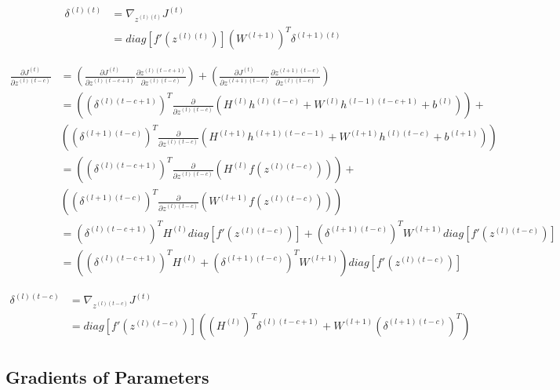 \documentclass{article}
\begin{document}
	\begin{equation}
	\begin{aligned}
		\delta^{(l)(t)} 
		&= \nabla_{z^{(l)(t)}} J^{(t)} \\
		&= diag[f'(z^{(l)(t)})] (W^{(l+1)})^T \delta^{(l+1)(t)}
	\end{aligned}
	\end{equation}
	
	\begin{equation}
	\begin{aligned}
		\frac{\partial J^{(t)}}{\partial z^{(l)(t-c)}} 
		&= \left(\frac{\partial J^{(t)}}{\partial z^{(l)(t-c+1)}} 
		\frac{\partial z^{(l)(t-c+1)}}{\partial z^{(l)(t-c)}}\right) + \left(\frac{\partial J^{(t)}}{\partial z^{(l+1)(t-c)}} 
		\frac{\partial z^{(l+1)(t-c)}}{\partial z^{(l)(t-c)}}\right)\\
		&= \left((\delta^{(l)(t-c+1)})^T \frac{\partial}{\partial z^{(l)(t-c)}} (H^{(l)} h^{(l)(t-c)} + W^{(l)} h^{(l-1)(t-c+1)} + b^{(l)}) \right) +\\
		& \left( (\delta^{(l+1)(t-c)})^T \frac{\partial}{\partial z^{(l)(t-c)}}(H^{(l+1)} h^{(l+1)(t-c-1)} + W^{(l+1)} h^{(l)(t-c)} + b^{(l+1)}) \right)\\
		&= \left((\delta^{(l)(t-c+1)})^T \frac{\partial}{\partial z^{(l)(t-c)}} (H^{(l)} f(z^{(l)(t-c)}))\right) +\\
		&\left( (\delta^{(l+1)(t-c)})^T \frac{\partial}{\partial z^{(l)(t-c)}}(W^{(l+1)} f(z^{(l)(t-c)}))\right)\\
		&= (\delta^{(l)(t-c+1)})^T H^{(l)} diag[f'(z^{(l)(t-c)})] + 
		(\delta^{(l+1)(t-c)})^T W^{(l+1)} diag[f'(z^{(l)(t-c)})] \\
		&= ((\delta^{(l)(t-c+1)})^T H^{(l)} + 
		(\delta^{(l+1)(t-c)})^T W^{(l+1)}) diag[f'(z^{(l)(t-c)})]  
	\end{aligned}
	\end{equation}
	
	\begin{equation}
	\begin{aligned}
		\delta^{(l)(t-c)} &= \nabla_{z^{(l)(t-c)}} J^{(t)} \\
		&= diag[f'(z^{(l)(t-c)})] ((H^{(l)})^T \delta^{(l)(t-c+1)} + W^{(l+1)} (\delta^{(l+1)(t-c)})^T)
	\end{aligned}
	\end{equation}
	
	\subsection{Gradients of Parameters}
	
\end{document}
